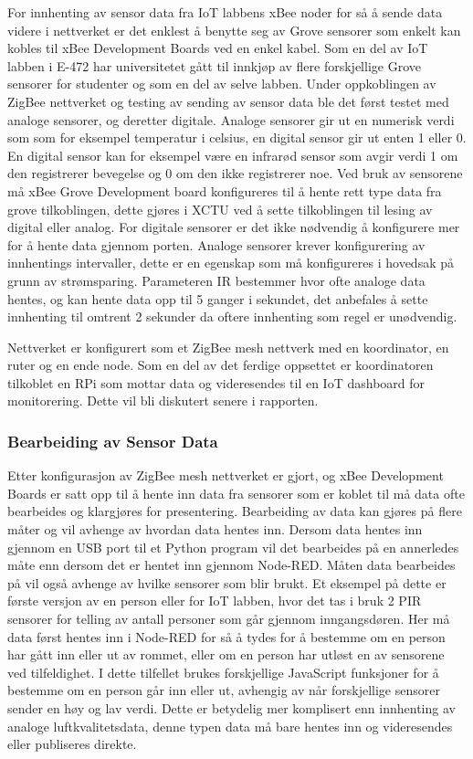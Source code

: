 \documentclass{article}
\begin{document}
For innhenting av sensor data fra IoT labbens xBee noder for så å sende data videre i nettverket er det enklest å benytte seg av Grove sensorer som enkelt kan kobles til xBee Development Boards ved en enkel kabel. Som en del av IoT labben i E-472 har universitetet gått til innkjøp av flere forskjellige Grove sensorer for studenter og som en del av selve labben. Under oppkoblingen av ZigBee nettverket og testing av sending av sensor data ble det først testet med analoge sensorer, og deretter digitale. Analoge sensorer gir ut en numerisk verdi som som for eksempel temperatur i celsius, en digital sensor gir ut enten 1 eller 0. En digital sensor kan for eksempel være en infrarød sensor som avgir verdi 1 om den registrerer bevegelse og 0 om den ikke registrerer noe. Ved bruk av sensorene må xBee Grove Development board konfigureres til å hente rett type data fra grove tilkoblingen, dette gjøres i XCTU ved å sette tilkoblingen til lesing av digital eller analog. For digitale sensorer er det ikke nødvendig å konfigurere mer for å hente data gjennom porten. Analoge sensorer krever konfigurering av innhentings intervaller, dette er en egenskap som må konfigureres i hovedsak på grunn av strømsparing. Parameteren IR bestemmer hvor ofte analoge data hentes, og kan hente data opp til 5 ganger i sekundet, det anbefales å sette innhenting til omtrent 2 sekunder da oftere innhenting som regel er unødvendig.

Nettverket er konfigurert som et ZigBee mesh nettverk med en koordinator, en ruter og en ende node. Som en del av det ferdige oppsettet er koordinatoren tilkoblet en RPi som mottar data og videresendes til en IoT dashboard for monitorering. Dette vil bli diskutert senere i rapporten.

\subsubsection{Bearbeiding  av Sensor Data}
Etter konfigurasjon av ZigBee mesh nettverket er gjort, og xBee Development Boards er satt opp til å hente inn data fra sensorer som er koblet til må data ofte bearbeides og klargjøres for presentering. Bearbeiding av data kan gjøres på flere måter og vil avhenge av hvordan data hentes inn. Dersom data hentes inn gjennom en USB port til et Python program vil det bearbeides på en annerledes måte enn dersom det er hentet inn gjennom Node-RED. Måten data bearbeides på vil også avhenge av hvilke sensorer som blir brukt. Et eksempel på dette er første versjon av en person eller for IoT labben, hvor det tas i bruk 2 PIR sensorer for telling av antall personer som går gjennom inngangsdøren. Her må data først hentes inn i Node-RED for så å tydes for å bestemme om en person har gått inn eller ut av rommet, eller om en person har utløst en av sensorene ved tilfeldighet. I dette tilfellet brukes forskjellige JavaScript funksjoner for å bestemme om en person går inn eller ut, avhengig av når forskjellige sensorer sender en høy og lav verdi. Dette er betydelig mer komplisert enn innhenting av analoge luftkvalitetsdata, denne typen data må bare hentes inn og videresendes eller publiseres direkte. 
\end{document}
